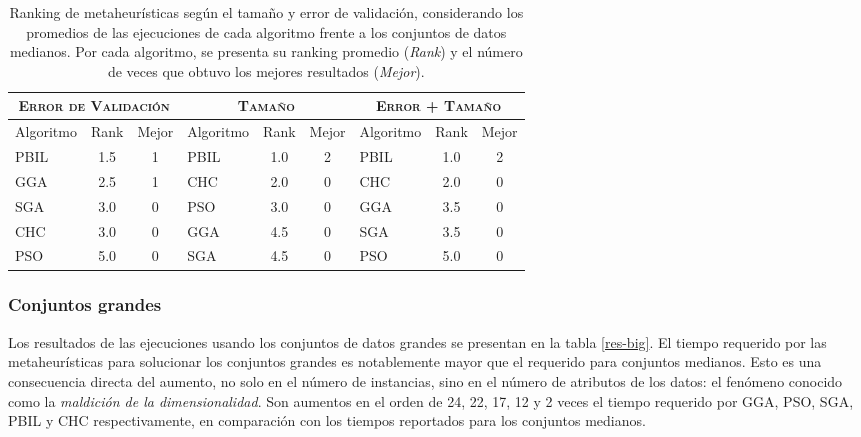 \begin{table}[h!]
\centering
\begin{tabular}{l c c|l c c|l c c}
\hline
\multicolumn{3}{c|}{\textsc{Error de Validación}}
	& \multicolumn{3}{c|}{\textsc{Tamaño}}
	& \multicolumn{3}{c}{\textsc{Error + Tamaño}} \\
\hline
Algoritmo & Rank & Mejor & Algoritmo & Rank & Mejor & Algoritmo & Rank & Mejor \\
\hline
\hline
PBIL & 1.5 & 1 & PBIL & 1.0 & 2 & PBIL & 1.0 & 2 \\
GGA  & 2.5 & 1 & CHC  & 2.0 & 0 & CHC  & 2.0 & 0 \\
SGA  & 3.0 & 0 & PSO  & 3.0 & 0 & GGA  & 3.5 & 0 \\
CHC  & 3.0 & 0 & GGA  & 4.5 & 0 & SGA  & 3.5 & 0 \\
PSO  & 5.0 & 0 & SGA  & 4.5 & 0 & PSO  & 5.0 & 0 \\
\hline
\end{tabular}
\caption[Ranking de metaheurísticas según el tamaño y error de validación en conjuntos de datos medianos]{Ranking de metaheurísticas según el tamaño y error de validación, considerando los promedios de las ejecuciones de cada algoritmo frente a los conjuntos de datos medianos. Por cada algoritmo, se presenta su ranking promedio (\emph{Rank}) y el número de veces que obtuvo los mejores resultados (\emph{Mejor}).}
\label{res-med-rank}
\end{table}

\subsubsection{Conjuntos grandes}

Los resultados de las ejecuciones usando los conjuntos de datos grandes se presentan en la tabla \ref{res-big}. El tiempo requerido por las metaheurísticas para solucionar los conjuntos grandes es notablemente mayor que el requerido para conjuntos medianos. Esto es una consecuencia directa del aumento, no solo en el número de instancias, sino en el número de atributos de los datos: el fenómeno conocido como la \guillemotleft\emph{maldición de la dimensionalidad}\guillemotright. Son aumentos en el orden de 24, 22, 17, 12 y 2 veces el tiempo requerido por GGA, PSO, SGA, PBIL y CHC respectivamente, en comparación con los tiempos reportados para los conjuntos medianos.


